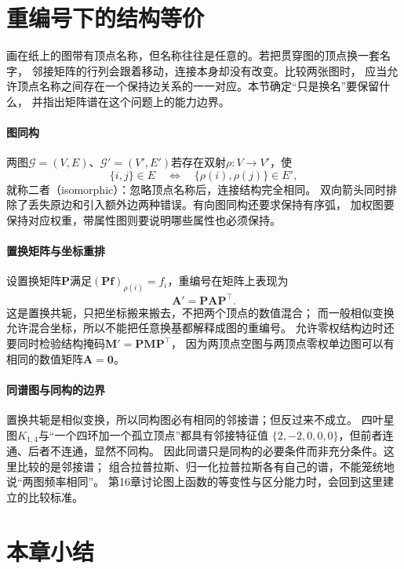\section{重编号下的结构等价}
\label{sec:graph-theory-graph-isomorphism}

画在纸上的图带有顶点名称，但名称往往是任意的。若把贯穿图的顶点换一套名字，
邻接矩阵的行列会跟着移动，连接本身却没有改变。比较两张图时，
应当允许顶点名称之间存在一个保持边关系的一一对应。本节确定“只是换名”要保留什么，
并指出矩阵谱在这个问题上的能力边界。

\paragraph{图同构}
两图$\mathcal G=(V,E)$、$\mathcal G'=(V',E')$若存在双射$\rho:V\to V'$，使
\[
  \{i,j\}\in E
  \quad\Longleftrightarrow\quad
  \{\rho(i),\rho(j)\}\in E',
\]
就称二者（isomorphic）：忽略顶点名称后，连接结构完全相同。
双向箭头同时排除了丢失原边和引入额外边两种错误。有向图同构还要求保持有序弧，
加权图要保持对应权重，带属性图则要说明哪些属性也必须保持。

\paragraph{置换矩阵与坐标重排}
设置换矩阵$\bm P$满足$(\bm P\bm f)_{\rho(i)}=f_i$，重编号在矩阵上表现为
\begin{equation}
  \bm A'=\bm P\bm A\bm P^\top.
  \label{eq:graph-theory-adjacency-relabel}
\end{equation}
这是置换共轭，只把坐标搬来搬去，不把两个顶点的数值混合；
而一般相似变换允许混合坐标，所以不能把任意换基都解释成图的重编号。
允许零权结构边时还要同时检验结构掩码$\bm M'=\bm P\bm M\bm P^\top$，
因为两顶点空图与两顶点零权单边图可以有相同的数值矩阵$\bm A=\bm 0$。

\paragraph{同谱图与同构的边界}
置换共轭是相似变换，所以同构图必有相同的邻接谱；但反过来不成立。
四叶星图$K_{1,4}$与“一个四环加一个孤立顶点”都具有邻接特征值
$\{2,-2,0,0,0\}$，但前者连通、后者不连通，显然不同构。
因此同谱只是同构的必要条件而非充分条件。这里比较的是邻接谱；
组合拉普拉斯、归一化拉普拉斯各有自己的谱，不能笼统地说“两图频率相同”。
第16章讨论图上函数的等变性与区分能力时，会回到这里建立的比较标准。

\section{本章小结}


